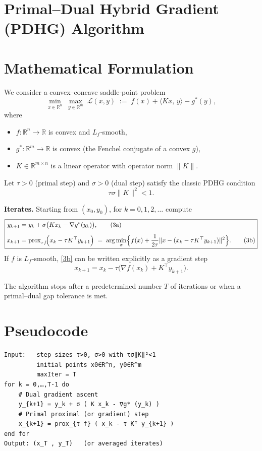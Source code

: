 \documentclass{article}
\begin{document}
\section*{Primal–Dual Hybrid Gradient (PDHG) Algorithm}

\section*{Mathematical Formulation}
We consider a convex–concave saddle‑point problem
\[
\min_{x\in\mathbb R^{n}} \; \max_{y\in\mathbb R^{m}} \;
\mathcal L(x,y)\;:=\; f(x)+\langle Kx ,\,y\rangle - g^{*}(y),
\tag{1}
\]
where  

\begin{itemize}
\item $f:\mathbb R^{n}\rightarrow\mathbb R$ is convex and $L_{f}$‑smooth,
\item $g^{*}:\mathbb R^{m}\rightarrow\mathbb R$ is convex (the Fenchel conjugate of a convex $g$),
\item $K\in\mathbb R^{m\times n}$ is a linear operator with operator norm $\|K\|$.
\end{itemize}

Let $\tau>0$ (primal step) and $\sigma>0$ (dual step) satisfy the classic PDHG condition
\[
\tau\sigma\|K\|^{2}<1 .
\tag{2}
\]

\bigskip
\noindent\textbf{Iterates.} Starting from $(x_{0},y_{0})$, for $k=0,1,2,\dots$ compute
\[
\boxed{
\begin{aligned}
y_{k+1}&= y_{k}+ \sigma\bigl(Kx_{k}-\nabla g^{*}(y_{k})\bigr), \tag{3a}\\[4pt]
x_{k+1}&= \operatorname{prox}_{\tau f}\!\Bigl(x_{k}-\tau K^{\top}y_{k+1}\Bigr)
      \;=\; \arg\min_{x}\Bigl\{ f(x)+\frac{1}{2\tau}\|x- (x_{k}-\tau K^{\top}y_{k+1})\|^{2}\Bigr\}. \tag{3b}
\end{aligned}}
\]
If $f$ is $L_{f}$‑smooth, \eqref{3b} can be written explicitly as a gradient step
\[
x_{k+1}=x_{k}-\tau\bigl(\nabla f(x_{k})+K^{\top}y_{k+1}\bigr).
\tag{4}
\]

The algorithm stops after a predetermined number $T$ of iterations or when a
primal–dual gap tolerance is met.

\section*{Pseudocode}
\begin{verbatim}
Input:   step sizes τ>0, σ>0 with τσ‖K‖²<1
         initial points x0∈R^n, y0∈R^m
         maxIter = T
for k = 0,…,T-1 do
    # Dual gradient ascent
    y_{k+1} = y_k + σ ( K x_k - ∇g* (y_k) )
    # Primal proximal (or gradient) step
    x_{k+1} = prox_{τ f} ( x_k - τ Kᵀ y_{k+1} )
end for
Output: (x_T , y_T)   (or averaged iterates)
\end{verbatim}
\end{document}
